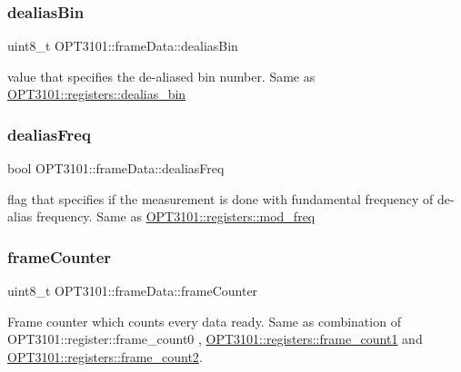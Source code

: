 \subsubsection{\texorpdfstring{dealias\+Bin}{dealiasBin}}
{\footnotesize\ttfamily uint8\+\_\+t O\+P\+T3101\+::frame\+Data\+::dealias\+Bin}



value that specifies the de-\/aliased bin number. Same as \mbox{\hyperlink{class_o_p_t3101_1_1registers_a1faab11698859e9d42e148c1d8cd5d1e}{O\+P\+T3101\+::registers\+::dealias\+\_\+bin}} 

\mbox{\label{class_o_p_t3101_1_1frame_data_a7f4b242739da2cabd965a01d1362c38e}} 
\subsubsection{\texorpdfstring{dealias\+Freq}{dealiasFreq}}
{\footnotesize\ttfamily bool O\+P\+T3101\+::frame\+Data\+::dealias\+Freq}



flag that specifies if the measurement is done with fundamental frequency of de-\/alias frequency. Same as \mbox{\hyperlink{class_o_p_t3101_1_1registers_ad0a150fb8c5e1efeae026e76f2bdbc1f}{O\+P\+T3101\+::registers\+::mod\+\_\+freq}} 

\mbox{\label{class_o_p_t3101_1_1frame_data_a571ec2f70947b37d3597d5ee623367d4}} 
\subsubsection{\texorpdfstring{frame\+Counter}{frameCounter}}
{\footnotesize\ttfamily uint8\+\_\+t O\+P\+T3101\+::frame\+Data\+::frame\+Counter}



Frame counter which counts every data ready. Same as combination of O\+P\+T3101\+::register\+::frame\+\_\+count0 , \mbox{\hyperlink{class_o_p_t3101_1_1registers_a736858f4b79f2dd5444fc1938148d438}{O\+P\+T3101\+::registers\+::frame\+\_\+count1}} and \mbox{\hyperlink{class_o_p_t3101_1_1registers_a1247368fca5573a9ab4b69d541c53a57}{O\+P\+T3101\+::registers\+::frame\+\_\+count2}}. 

